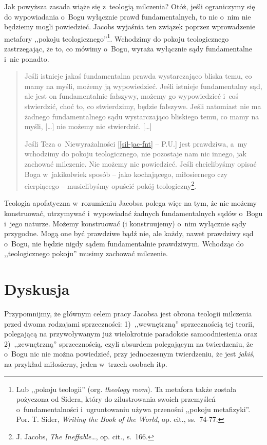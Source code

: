 Jak powyższa zasada wiąże się z~teologią milczenia? Otóż, jeśli ograniczymy się do wypowiadania o~Bogu wyłącznie prawd fundamentalnych, to nic o~nim nie będziemy mogli powiedzieć. Jacobs wyjaśnia ten związek poprzez wprowadzenie metafory ,,pokoju teologicznego''\footnote{Lub ,,pokoju teologii'' (org. \textit{theology room}). Ta metafora także została pożyczona od Sidera, który do zilustrowania swoich przemyśleń o~fundamentalności i~ugruntowaniu używa przenośni ,,pokoju metafizyki''. Por. T. Sider, \textit{Writing the Book of the World}, op. cit., ss.~74-77.}. Wchodzimy do pokoju teologicznego zastrzegając, że to, co mówimy o~Bogu, wyraża wyłącznie sądy fundamentalne i~nic ponadto.

\begin{quote}
Jeśli istnieje jakaś fundamentalna prawda wystarczająco bliska temu, co mamy na myśli, możemy ją wypowiedzieć. Jeśli istnieje fundamentalny sąd, ale jest on fundamentalnie fałszywy, możemy go wypowiedzieć i~coś stwierdzić, choć to, co stwierdzimy, będzie fałszywe. Jeśli natomiast nie ma żadnego fundamentalnego sądu wystarczająco bliskiego temu, co mamy na myśli, [\ldots] nie możemy nic stwierdzić. [\ldots]

Jeśli Teza o~Niewyrażalności [\ref{sil-jac-fnt} -- P.U.] jest prawdziwa, a~my wchodzimy do pokoju teologicznego, nie pozostaje nam nic innego, jak zachować milczenie. Nie możemy nic powiedzieć. Jeśli chcielibyśmy opisać Boga w~jakikolwiek sposób -- jako kochającego, miłosiernego czy cierpiącego -- musielibyśmy opuścić pokój teologiczny\footnote{J. Jacobs, \textit{The Ineffable}\ldots, op. cit., s.~166.}.
\end{quote}

Teologia apofatyczna w~rozumieniu Jacobsa polega więc na tym, że nie możemy konstruować, utrzymywać i~wypowiadać żadnych fundamentalnych sądów o~Bogu i~jego naturze. Możemy konstruować (i konstruujemy) o~nim wyłącznie sądy przygodne. Mogą one być prawdziwe bądź nie, ale każdy, nawet prawdziwy sąd o~Bogu, nie będzie nigdy sądem fundamentalnie prawdziwym. Wchodząc do ,,teologicznego pokoju'' musimy zachować milczenie.


\section{Dyskusja}

Przypomnijmy, że głównym celem pracy Jacobsa jest obrona teologii milczenia przed dwoma rodzajami sprzeczności: 1)~,,wewnętrzną'' sprzecznością tej teorii, polegającą na przywoływanym już wielokrotnie paradoksie samoodniesienia oraz 2)~,,zewnętrzną'' sprzecznością, czyli absurdem polegającym na twierdzeniu, że o~Bogu nic nie można powiedzieć, przy jednoczesnym twierdzeniu, że jest \textit{jakiś}, na przykład miłosierny, jeden w~trzech osobach itp.

